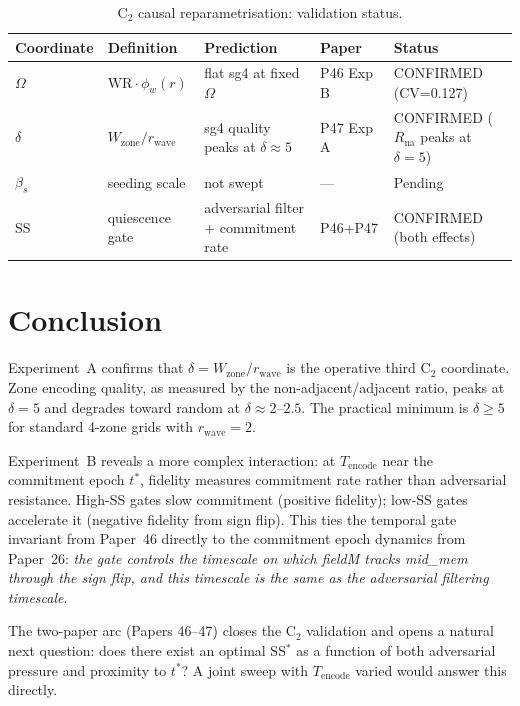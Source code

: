 \documentclass[11pt,a4paper]{article}
\begin{document}
\begin{table}[h]
\centering
\caption{C$_2$ causal reparametrisation: validation status.}
\label{tab:c2}
\begin{tabular}{lllll}
\toprule
Coordinate & Definition & Prediction & Paper & Status \\
\midrule
$\Omega$ & $\mathrm{WR}\cdot\phi_w(r)$ & flat sg4 at fixed $\Omega$ &
  P46 Exp B & CONFIRMED (CV=0.127) \\
$\delta$ & $W_\text{zone}/r_\text{wave}$ & sg4 quality peaks at $\delta \approx 5$ &
  P47 Exp A & CONFIRMED ($R_\text{na}$ peaks at $\delta=5$) \\
$\beta_s$ & seeding scale & not swept & --- & Pending \\
\midrule
SS & quiescence gate & adversarial filter + commitment rate &
  P46+P47 & CONFIRMED (both effects) \\
\bottomrule
\end{tabular}
\end{table}

\section{Conclusion}

Experiment~A confirms that $\delta = W_\text{zone}/r_\text{wave}$ is the
operative third C$_2$ coordinate.  Zone encoding quality, as measured by the
non-adjacent/adjacent ratio, peaks at $\delta = 5$ and degrades toward random
at $\delta \approx 2$--$2.5$.  The practical minimum is $\delta \geq 5$ for
standard 4-zone grids with $r_\text{wave}=2$.

Experiment~B reveals a more complex interaction: at $T_\text{encode}$ near the
commitment epoch $t^*$, fidelity measures commitment rate rather than
adversarial resistance.  High-SS gates slow commitment (positive fidelity);
low-SS gates accelerate it (negative fidelity from sign flip).  This ties the
temporal gate invariant from Paper~46 directly to the commitment epoch dynamics
from Paper~26: \emph{the gate controls the timescale on which fieldM tracks
mid\_mem through the sign flip, and this timescale is the same as the
adversarial filtering timescale}.

The two-paper arc (Papers 46--47) closes the C$_2$ validation and opens a
natural next question: does there exist an optimal SS$^*$ as a function of
both adversarial pressure and proximity to $t^*$?  A joint sweep with
$T_\text{encode}$ varied would answer this directly.
\end{document}
